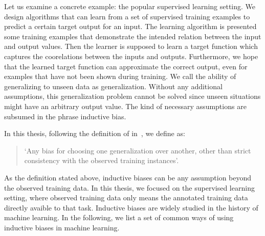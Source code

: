 Let us examine a concrete example: the popular supervised learning
setting.  We design algorithms that can learn from a set of supervised
training examples to predict a certain target output for an input. The
learning algorithm is presented some training examples that
demonstrate the intended relation between the input and output
values. Then the learner is supposed to learn a target function which
captures the coorelations between the inputs and outputs. Furthermore,
we hope that the learned target function can approximate the correct
output, even for examples that have not been shown during training. We
call the ability of generalizing to unseen data as
generalization. Without any additional assumptions, this
generalization problem cannot be solved since unseen situations might
have an arbitrary output value. The kind of necessary assumptions are
subsumed in the phrase inductive bias.

In this thesis, following the definition of 
in~\cite{mitchell1980need}, we define  as:

\begin{quote}
  \label{def:bias}
  `Any bias for choosing one generalization over another, other than
  strict consistency with the observed training instances'.
\end{quote}


As the definition stated above, inductive biases can be any assumption
beyond the observed training data. In this thesis, we focused on the
supervised learning setting, where observed training data only means
the annotated training data directly avaible to that task. Inductive
biases are widely studied in the history of machine learning. In the
following, we list a set of common ways of using inductive biases in
machine learning.

